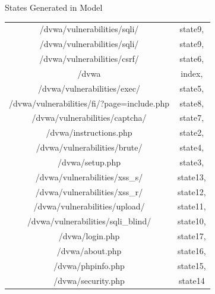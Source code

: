 \documentclass{beamer}
\begin{document}
\begin{frame}{States Generated in Model}
\begin{table}[]
\centering
\label{State Generated in Model}
\begin{tabular}{||c | c||}
\hline
/dvwa/vulnerabilities/sqli/                & state9,  \\
/dvwa/vulnerabilities/sqli/                & state9,  \\
/dvwa/vulnerabilities/csrf/                & state6,  \\
/dvwa                                      & index,   \\
/dvwa/vulnerabilities/exec/                & state5,  \\
/dvwa/vulnerabilities/fi/?page=include.php & state8,  \\
/dvwa/vulnerabilities/captcha/             & state7,  \\
/dvwa/instructions.php                     & state2,  \\
/dvwa/vulnerabilities/brute/               & state4,  \\
/dvwa/setup.php                            & state3,  \\
/dvwa/vulnerabilities/xss\_s/              & state13, \\
/dvwa/vulnerabilities/xss\_r/              & state12, \\
/dvwa/vulnerabilities/upload/              & state11, \\
/dvwa/vulnerabilities/sqli\_blind/         & state10, \\
/dvwa/login.php                            & state17, \\
/dvwa/about.php                            & state16, \\
/dvwa/phpinfo.php                          & state15, \\
/dvwa/security.php                         & state14 \\
\hline

\end{tabular}
\end{table}

\end{frame}
\end{document}
